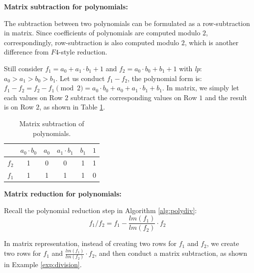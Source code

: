{\bf Matrix subtraction for polynomials:}	

	The subtraction between two polynomials can be formulated as a row-subtraction in matrix.
	Since coefficients of polynomials are computed modulo $2$, correspondingly, row-subtraction is also computed modulo $2$, 
	which is another difference from $F4$-style reduction.
	
\begin{Example}	
	Still consider $f_{1}=a_{0}+a_{1}\cdot b_{1}+1$ and $f_{2}=a_{0}\cdot b_{0}+b_{1}+1$ with {\it lp}: $a_{0}>a_{1}>b_{0}>b_{1}$.
	Let us conduct $f_{1}-f_{2}$, the polynomial form is: 
	$f_{1}-f_{2}=f_{2}-f_{1} \pmod 2=a_{0}\cdot b_{0}+a_{0}+a_{1}\cdot b_{1}+b_{1}$.
	In matrix, we simply let each values on Row $2$ subtract the corresponding values on Row $1$ and the result is on Row $2$,
	as shown in Table \ref{tab:subtract}.
	
	 \begin{table}[h!]
	\begin{center}
	\caption{Matrix subtraction of polynomials.}
	\label{tab:subtract}
	\begin{tabular}{|c|c|c|c|c|c|} \hline 
			& $a_{0}\cdot b_{0}$  & $a_{0}$ & $a_{1}\cdot b_{1}$ & $b_{1}$ & $1$  \\
	\hline 
	$f_{2}$ & 1 &0 & 0 & 1 & 1 \\
	\hline
	$f_{1}$ & 1 &1 & 1 & 1 & 0 \\
	\hline
	\end{tabular}
	\end{center}
	\end{table}
	
\end{Example}

{\bf Matrix reduction for polynomials:}

Recall the polynomial reduction step in Algorithm \ref{alg:polydiv}: 
\begin{equation}
	{f_1}/{f_2}=f_{1}-\frac{lm(f_1)}{lm(f_2)}\cdot f_{2} \nonumber
\end{equation}
 
 In matrix representation, instead of creating two rows for $f_{1}$ and $f_{2}$, 
 we create two rows for $f_{1}$ and $\frac{lm(f_1)}{lm(f_2)}\cdot f_{2}$,
 and then conduct a matrix subtraction, as shown in Example \ref{exp:division}. 
 
